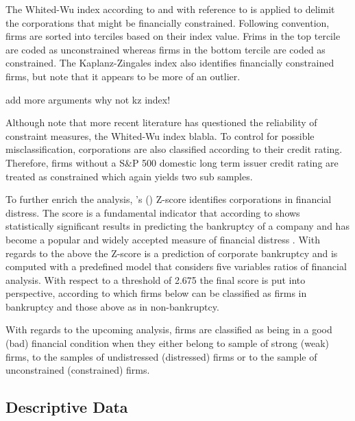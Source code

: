 \documentclass[12pt]{article}
\begin{document}
The Whited-Wu index according to \citet[p.543]{Whited2006} and with reference to \citet[p.38]{Farre-mensa2013} is applied to delimit the corporations that might be financially constrained. Following convention, firms are sorted into terciles based on their index value. Frims in the top tercile are coded as unconstrained whereas firms in the bottom tercile are coded as constrained. The Kaplanz-Zingales index also identifies financially constrained firms, but \citet[p.]{Farre-mensa2013} note that it appears to be more of an outlier. 
\begin{center}
	add more arguments why not kz index! 
\end{center}
Although \citet{Khatami2014} note that more recent literature has questioned the reliability of constraint measures, the Whited-Wu index  blabla. To control for possible misclassification, corporations are also classified according to their credit rating. Therefore, firms without a S\&P 500 domestic long term issuer credit rating are treated as constrained \citep[p.6]{Farre-mensa2013} which again yields two sub samples. 

To further enrich the analysis, \citeauthor{Altman1968}'s (\citeyear{Altman1968}) Z-score identifies corporations in financial distress. The score is a fundamental indicator that according to \citet[p.5]{Mohr2012} shows statistically significant results in predicting the bankruptcy of a company and has become a popular and widely accepted measure of financial distress \citep[p.2903]{Campbell2008}. 
With regards to the above the Z-score is a prediction of corporate bankruptcy \citep[p.594]{Altman} and is computed with a predefined model that considers five variables ratios of financial analysis. With respect to a threshold of 2.675 \citep[p.607]{Altman1968} the final score is put into perspective, according to which firms below can be classified as firms in bankruptcy and those above as in non-bankruptcy. 

With regards to the upcoming analysis, firms are classified as being in a good (bad) financial condition when they either belong to sample of strong (weak) firms, to the samples of undistressed (distressed) firms or to the sample of unconstrained (constrained) firms.


\subsection{Descriptive Data}
\end{document}
